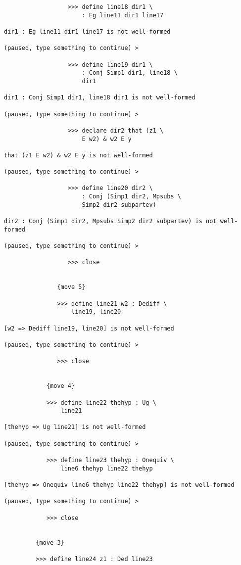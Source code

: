 \documentclass[12pt]{article}
\begin{document}
\begin{verbatim}
                  >>> define line18 dir1 \
                      : Eg line11 dir1 line17

dir1 : Eg line11 dir1 line17 is not well-formed

(paused, type something to continue) >

                  >>> define line19 dir1 \
                      : Conj Simp1 dir1, line18 \
                      dir1

dir1 : Conj Simp1 dir1, line18 dir1 is not well-formed

(paused, type something to continue) >

                  >>> declare dir2 that (z1 \
                      E w2) & w2 E y

that (z1 E w2) & w2 E y is not well-formed

(paused, type something to continue) >

                  >>> define line20 dir2 \
                      : Conj (Simp1 dir2, Mpsubs \
                      Simp2 dir2 subpartev)

dir2 : Conj (Simp1 dir2, Mpsubs Simp2 dir2 subpartev) is not well-formed

(paused, type something to continue) >

                  >>> close


               {move 5}

               >>> define line21 w2 : Dediff \
                   line19, line20

[w2 => Dediff line19, line20] is not well-formed

(paused, type something to continue) >

               >>> close


            {move 4}

            >>> define line22 thehyp : Ug \
                line21

[thehyp => Ug line21] is not well-formed

(paused, type something to continue) >

            >>> define line23 thehyp : Onequiv \
                line6 thehyp line22 thehyp

[thehyp => Onequiv line6 thehyp line22 thehyp] is not well-formed

(paused, type something to continue) >

            >>> close


         {move 3}

         >>> define line24 z1 : Ded line23


\end{verbatim}
\end{document}
